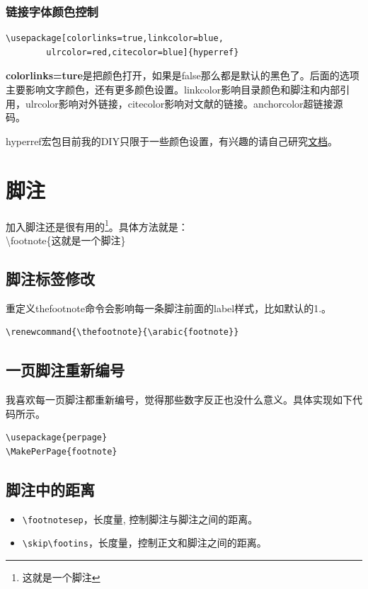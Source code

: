 \documentclass[12pt,oneside]{book}
\begin{document}
\begin{common-format}
\subsubsection{链接字体颜色控制}
\begin{Verbatim}
\usepackage[colorlinks=true,linkcolor=blue,
        ulrcolor=red,citecolor=blue]{hyperref} 
\end{Verbatim}

\textbf{colorlinks=ture}是把颜色打开，如果是false那么都是默认的黑色了。后面的选项主要影响文字颜色，还有更多颜色设置。linkcolor影响目录颜色和脚注和内部引用，ulrcolor影响对外链接，citecolor影响对文献的链接。anchorcolor超链接源码。

hyperref宏包目前我的DIY只限于一些颜色设置，有兴趣的请自己研究\href{http://mirrors.ctan.org/macros/latex/contrib/hyperref/doc/manual.pdf}{文档}。



\section{脚注}
加入脚注还是很有用的\footnote{这就是一个脚注}。具体方法就是：\\
\textbackslash footnote\{这就是一个脚注\} 

\subsection{脚注标签修改}
重定义thefootnote命令会影响每一条脚注前面的label样式，比如默认的1.。
\begin{Verbatim}
\renewcommand{\thefootnote}{\arabic{footnote}}
\end{Verbatim}


\subsection{一页脚注重新编号}
我喜欢每一页脚注都重新编号，觉得那些数字反正也没什么意义。具体实现如下代码所示。
\begin{Verbatim}
\usepackage{perpage} 
\MakePerPage{footnote} 
\end{Verbatim}


\subsection{脚注中的距离}
\begin{itemize}
\item \verb+\footnotesep+，长度量, 控制脚注与脚注之间的距离。
\item \verb+\skip\footins+，长度量，控制正文和脚注之间的距离。
\end{itemize}



\end{common-format}
\end{document}
